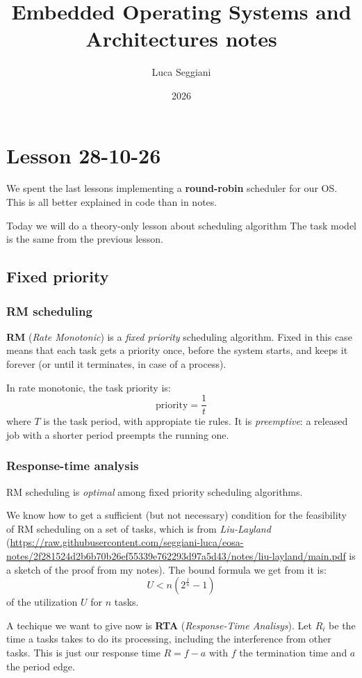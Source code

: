 \documentclass[a4paper,11pt]{article}
\title{Embedded Operating Systems and Architectures notes}
\author{Luca Seggiani}
\date{2026}
\begin{document}
\section{Lesson 28-10-26}

\thispagestyle{empty}
\pagestyle{fancy}

We spent the last lessons implementing a \textbf{round-robin} scheduler for our OS.
This is all better explained in code than in notes.

Today we will do a theory-only lesson about scheduling algorithm
The task model is the same from the previous lesson.

\subsection{Fixed priority}

\subsubsection{RM scheduling}
\textbf{RM} (\textit{Rate Monotonic}) is a \textit{fixed priority} scheduling algorithm.
Fixed in this case means that each task gets a priority once, before the system starts, and keeps it forever (or until it terminates, in case of a process).

In rate monotonic, the task priority is:
$$
	\text{priority} = \frac{1}{t}
$$
where $T$ is the task period, with appropiate tie rules.
It is \textit{preemptive}: a released job with a shorter period preempts the running one.

\subsubsection{Response-time analysis}

RM scheduling is \textit{optimal} among fixed priority scheduling algorithms.

We know how to get a sufficient (but not necessary) condition for the feasibility of RM scheduling on a set of tasks, which is from \textit{Liu-Layland} (\url{https://raw.githubusercontent.com/seggiani-luca/eosa-notes/2f281524d2b6b70b26ef55339e762293d97a5d43/notes/liu-layland/main.pdf} is a sketch of the proof from my notes).
The bound formula we get from it is:
$$
	U < n (2^\frac{1}{n} - 1)
$$
of the utilization $U$ for $n$ tasks.

A techique we want to give now is \textbf{RTA} (\textit{Response-Time Analisys}).
Let $R_i$ be the time a tasks takes to do its processing, including the interference from other tasks. This is just our response time $R = f - a$ with $f$ the termination time and $a$ the period edge.
\end{document}

